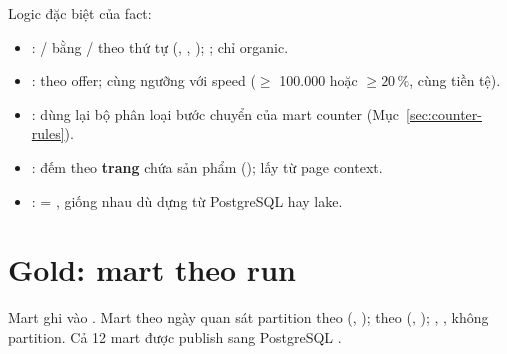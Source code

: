 Logic đặc biệt của fact:
\begin{itemize}
  \item {}: / bằng / theo thứ tự (, , ); ; chỉ organic.
  \item {}:  theo offer;  cùng ngưỡng với speed ($\ge$ 100.000 hoặc $\ge 20\,\%$, cùng tiền tệ).
  \item {}: dùng lại bộ phân loại bước chuyển của mart counter (Mục~\ref{sec:counter-rules}).
  \item {}: đếm theo \textbf{trang} chứa sản phẩm ();  lấy từ page context.
  \item {}:  = , giống nhau dù dựng từ PostgreSQL hay lake.
\end{itemize}

\section{Gold: mart theo run}\label{sec:marts}
Mart ghi vào . Mart theo ngày quan sát partition theo
(, );  theo (, );
, ,  không partition. Cả 12 mart được publish sang PostgreSQL
.


